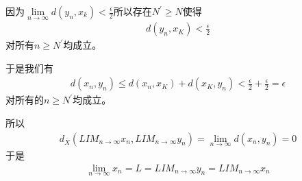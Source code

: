 \documentclass{article}
\begin{document}
\begin{itemize}
        因为$\lim\limits_{n \to \infty} d(y_n, x_k) < \frac{\epsilon}{2}$所以存在$N^\prime \geq N$使得
        \begin{align*}
          d(y_n, x_K) < \frac{\epsilon}{2}
        \end{align*}
        对所有$n \geq N^\prime$均成立。

        于是我们有
        \begin{align*}
          d(x_n, y_n) \leq d(x_n, x_K) + d(x_K, y_n) < \frac{\epsilon}{2} + \frac{\epsilon}{2} = \epsilon
        \end{align*}
        对所有的$n \geq N^\prime$均成立。

        所以
        \begin{align*}
          d_{\overline{X}}(LIM_{n \to \infty} x_n, LIM_{n \to \infty} y_n) = \lim\limits_{n \to \infty} d(x_n, y_n) = 0
        \end{align*}
        于是
        \begin{align*}
          \lim\limits_{n \to \infty} x_n = L = LIM_{n \to \infty} y_n = LIM_{n \to \infty} x_n
        \end{align*}





\end{itemize}
\end{document}

